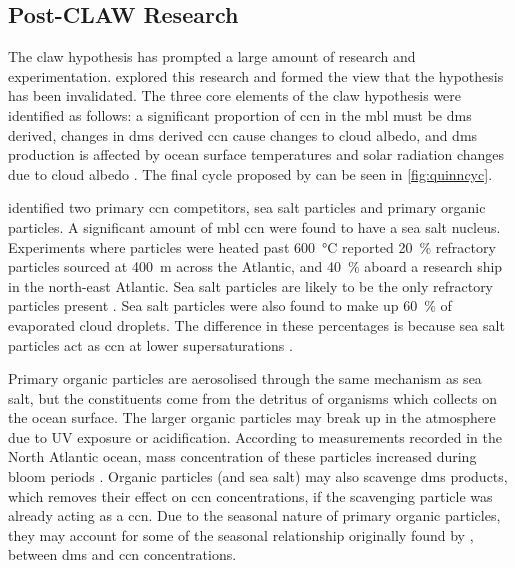 
		\subsection{Post-CLAW Research}
		\label{subsec:postclaw}

		The \gls{claw} hypothesis has prompted a large amount of research and experimentation. \citet{quinn:2011iv} explored this research and formed the view that the hypothesis has been invalidated. The three core elements of the \gls{claw} hypothesis were identified as follows: a significant proportion of \gls{ccn} in the \gls{mbl} must be \gls{dms} derived, changes in \gls{dms} derived \gls{ccn} cause changes to cloud albedo, and \gls{dms} production is affected by ocean surface temperatures and solar radiation changes due to cloud albedo \citep{quinn:2011iv}. The final cycle proposed by \citet{quinn:2011iv} can be seen in \cref{fig:quinncyc}.

		\citet{quinn:2011iv} identified two primary \gls{ccn} competitors, sea salt particles and primary organic particles. A significant amount of \gls{mbl} \gls{ccn} were found to have a sea salt nucleus. Experiments where particles were heated past \SI{600}{\celsius} reported \SI{20}{\percent} refractory particles sourced at \SI{400}{\metre} across the Atlantic, and \SI{40}{\percent} aboard a research ship in the north-east Atlantic. Sea salt particles are likely to be the only refractory particles present \citep{o1993physicochemical}. Sea salt particles were also found to make up \SI{60}{\percent} of evaporated cloud droplets. The difference in these percentages is because sea salt particles act as \gls{ccn} at lower supersaturations \citep{tang1997thermodynamic}.

		Primary organic particles are aerosolised through the same mechanism as sea salt, but the constituents come from the detritus of organisms which collects on the ocean surface. The larger organic particles may break up in the atmosphere due to UV exposure or acidification. According to measurements recorded in the North Atlantic ocean, mass concentration of these particles increased during bloom periods \citep{o2004biogenically}. Organic particles (and sea salt) may also scavenge \gls{dms} products, which removes their effect on \gls{ccn} concentrations, if the scavenging particle was already acting as a \gls{ccn}. Due to the seasonal nature of primary organic particles, they may account for some of the seasonal relationship originally found by \citet{ayers:1991gd}, between \gls{dms} and \gls{ccn} concentrations.

